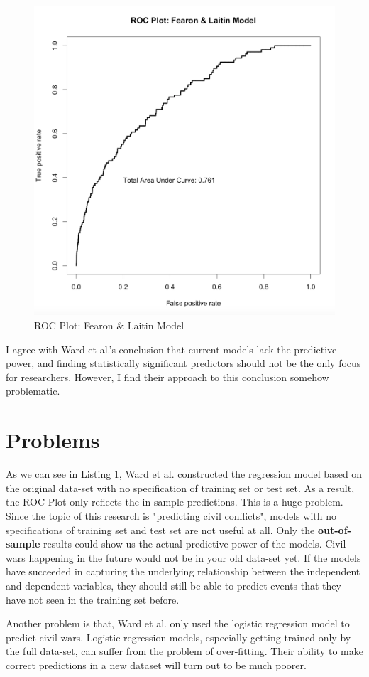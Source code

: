 \documentclass{article}
\begin{document}
\begin{figure}[h!]
    \centering
    \includegraphics[width=0.5\linewidth]{roc1.png}
    \caption{ROC Plot: Fearon \& Laitin Model}
    \label{roc1}
\end{figure}

I agree with Ward et al.'s conclusion that current models lack the predictive power, and finding statistically significant predictors should not be the only focus for researchers. However, I find their approach to this conclusion somehow problematic. 

\section{Problems}

As we can see in Listing 1, Ward et al. constructed the regression model based on the original data-set with no specification of training set or test set. As a result, the ROC Plot only reflects the in-sample predictions. This is a huge problem. Since the topic of this research is "predicting civil conflicts", models with no specifications of training set and test set are not useful at all. Only the \textbf{out-of-sample} results could show us the actual predictive power of the models. Civil wars happening in the future would not be in your old data-set yet. If the models have succeeded in capturing the underlying relationship between the independent and dependent variables, they should still be able to predict events that they have not seen in the training set before.

Another problem is that, Ward et al. only used the logistic regression model to predict civil wars. Logistic regression models, especially getting trained only by the full data-set, can suffer from the problem of over-fitting. Their ability to make correct predictions in a new dataset will turn out to be much poorer.
\end{document}

